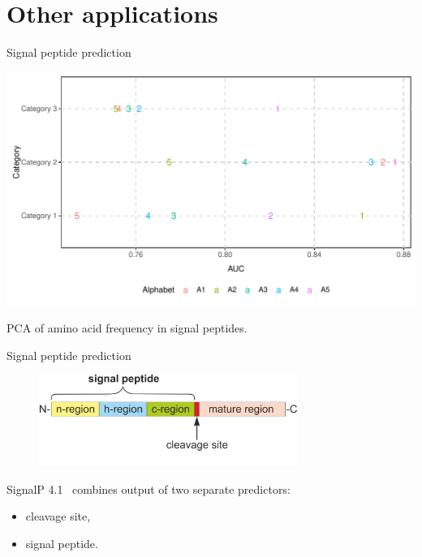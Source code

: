 \documentclass{beamer}\usepackage[]{graphicx}\usepackage[]{color}
\makeatletter
\def\maxwidth{ %
  \ifdim\Gin@nat@width>\linewidth
    \linewidth
  \else
    \Gin@nat@width
  \fi
}
\makeatother
\begin{document}
\section{Other applications}

\begin{frame}{Signal peptide prediction}

\includegraphics[width=\maxwidth]{figure/unnamed-chunk-19-1} 

PCA of amino acid frequency in signal peptides.

\end{frame}  


\begin{frame}{Signal peptide prediction}
\begin{figure} 
\includegraphics[width=0.75\textwidth]{static_figure/SP.png}
\end{figure}
SignalP 4.1~\citep{petersen_signalp_2011} combines output of two separate predictors:
\begin{itemize}
\item cleavage site,
\item signal peptide.
\end{itemize}
\end{frame}
\end{document}
